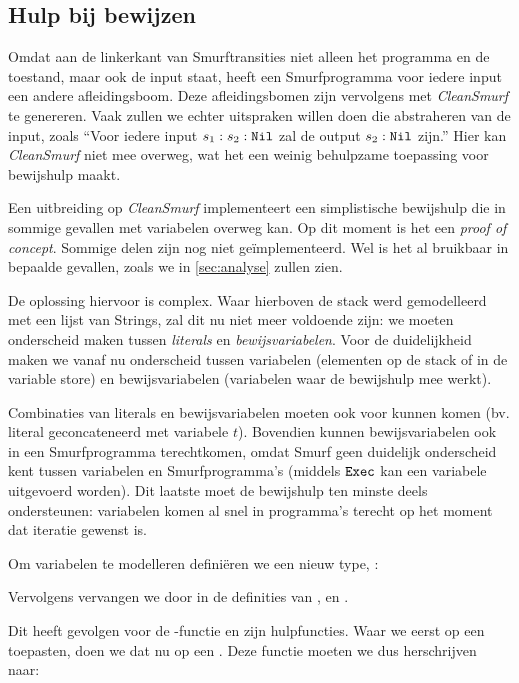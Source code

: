\subsection{Hulp bij bewijzen}
\label{sec:cleansmurf:proofs}

Omdat aan de linkerkant van Smurftransities niet alleen het programma en de
toestand, maar ook de input staat, heeft een Smurfprogramma voor iedere input
een andere afleidingsboom. Deze afleidingsbomen zijn vervolgens met
\emph{CleanSmurf} te genereren. Vaak zullen we echter uitspraken willen doen
die abstraheren van de input, zoals ``Voor iedere input $s_1:s_2:\texttt{Nil}$ zal de
output $s_2:\texttt{Nil}$ zijn.'' Hier kan \emph{CleanSmurf} niet mee overweg, wat het
een weinig behulpzame toepassing voor bewijshulp maakt.

Een uitbreiding op \emph{CleanSmurf} implementeert een simplistische bewijshulp
die in sommige gevallen met variabelen overweg kan. Op dit moment is het een
\emph{proof of concept}. Sommige delen zijn nog niet geïmplementeerd. Wel is
het al bruikbaar in bepaalde gevallen, zoals we in \autoref{sec:analyse} zullen
zien.

De oplossing hiervoor is complex. Waar hierboven de stack werd gemodelleerd met
een lijst van Strings, zal dit nu niet meer voldoende zijn: we moeten
onderscheid maken tussen \emph{literals} en \emph{bewijsvariabelen}. Voor de
duidelijkheid maken we vanaf nu onderscheid tussen variabelen (elementen op de
stack of in de variable store) en bewijsvariabelen (variabelen waar de
bewijshulp mee werkt).

Combinaties van literals en bewijsvariabelen moeten ook voor kunnen komen (bv.
literal  geconcateneerd met variabele $t$). Bovendien kunnen
bewijsvariabelen ook in een Smurfprogramma terechtkomen, omdat Smurf geen
duidelijk onderscheid kent tussen variabelen en Smurfprogramma's (middels
$\texttt{Exec}$ kan een variabele uitgevoerd worden). Dit laatste moet de bewijshulp
ten minste deels ondersteunen: variabelen komen al snel in programma's terecht
op het moment dat iteratie gewenst is.

Om variabelen te modelleren definiëren we een nieuw type, :



Vervolgens vervangen we  door  in de definities van
,  en .

Dit heeft gevolgen voor de -functie en zijn hulpfuncties. Waar we
eerst  op een  toepasten, doen we dat nu op een .
Deze functie moeten we dus herschrijven naar:

